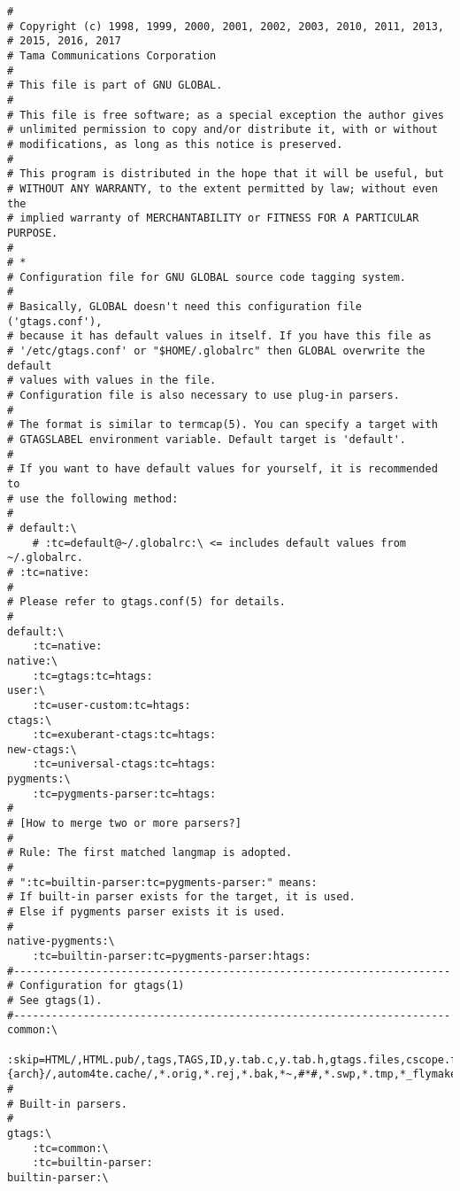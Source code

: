 \documentclass[11pt]{article}
\begin{document}
\lstset{language=bash,label= ,caption= ,captionpos=b,numbers=none}
\begin{lstlisting}
#
# Copyright (c) 1998, 1999, 2000, 2001, 2002, 2003, 2010, 2011, 2013,
# 2015, 2016, 2017
# Tama Communications Corporation
#
# This file is part of GNU GLOBAL.
#
# This file is free software; as a special exception the author gives
# unlimited permission to copy and/or distribute it, with or without
# modifications, as long as this notice is preserved.
#
# This program is distributed in the hope that it will be useful, but
# WITHOUT ANY WARRANTY, to the extent permitted by law; without even the
# implied warranty of MERCHANTABILITY or FITNESS FOR A PARTICULAR PURPOSE.
#
# *
# Configuration file for GNU GLOBAL source code tagging system.
#
# Basically, GLOBAL doesn't need this configuration file ('gtags.conf'),
# because it has default values in itself. If you have this file as
# '/etc/gtags.conf' or "$HOME/.globalrc" then GLOBAL overwrite the default
# values with values in the file.
# Configuration file is also necessary to use plug-in parsers.
#
# The format is similar to termcap(5). You can specify a target with
# GTAGSLABEL environment variable. Default target is 'default'.
#
# If you want to have default values for yourself, it is recommended to
# use the following method:
#
# default:\
    # :tc=default@~/.globalrc:\ <= includes default values from ~/.globalrc.
# :tc=native:
#
# Please refer to gtags.conf(5) for details.
#
default:\
    :tc=native:
native:\
    :tc=gtags:tc=htags:
user:\
    :tc=user-custom:tc=htags:
ctags:\
    :tc=exuberant-ctags:tc=htags:
new-ctags:\
    :tc=universal-ctags:tc=htags:
pygments:\
    :tc=pygments-parser:tc=htags:
#
# [How to merge two or more parsers?]
#
# Rule: The first matched langmap is adopted.
#
# ":tc=builtin-parser:tc=pygments-parser:" means:
# If built-in parser exists for the target, it is used.
# Else if pygments parser exists it is used.
#
native-pygments:\
    :tc=builtin-parser:tc=pygments-parser:htags:
#---------------------------------------------------------------------
# Configuration for gtags(1)
# See gtags(1).
#---------------------------------------------------------------------
common:\
    :skip=HTML/,HTML.pub/,tags,TAGS,ID,y.tab.c,y.tab.h,gtags.files,cscope.files,cscope.out,cscope.po.out,cscope.in.out,SCCS/,RCS/,CVS/,CVSROOT/,{arch}/,autom4te.cache/,*.orig,*.rej,*.bak,*~,#*#,*.swp,*.tmp,*_flymake.*,*_flymake,*.o,*.a,*.so,*.lo,*.zip,*.gz,*.bz2,*.xz,*.lzh,*.Z,*.tgz,*.min.js,*min.css:
#
# Built-in parsers.
#
gtags:\
    :tc=common:\
    :tc=builtin-parser:
builtin-parser:\

\end{lstlisting}
\end{document}
